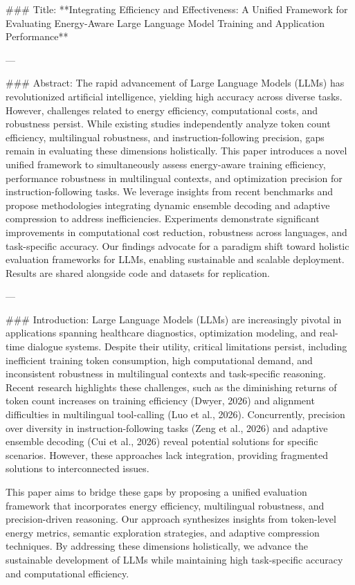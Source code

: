 ### Title:  
**Integrating Efficiency and Effectiveness: A Unified Framework for Evaluating Energy-Aware Large Language Model Training and Application Performance**

---

### Abstract:  
The rapid advancement of Large Language Models (LLMs) has revolutionized artificial intelligence, yielding high accuracy across diverse tasks. However, challenges related to energy efficiency, computational costs, and robustness persist. While existing studies independently analyze token count efficiency, multilingual robustness, and instruction-following precision, gaps remain in evaluating these dimensions holistically. This paper introduces a novel unified framework to simultaneously assess energy-aware training efficiency, performance robustness in multilingual contexts, and optimization precision for instruction-following tasks. We leverage insights from recent benchmarks and propose methodologies integrating dynamic ensemble decoding and adaptive compression to address inefficiencies. Experiments demonstrate significant improvements in computational cost reduction, robustness across languages, and task-specific accuracy. Our findings advocate for a paradigm shift toward holistic evaluation frameworks for LLMs, enabling sustainable and scalable deployment. Results are shared alongside code and datasets for replication.

---

### Introduction:  
Large Language Models (LLMs) are increasingly pivotal in applications spanning healthcare diagnostics, optimization modeling, and real-time dialogue systems. Despite their utility, critical limitations persist, including inefficient training token consumption, high computational demand, and inconsistent robustness in multilingual contexts and task-specific reasoning. Recent research highlights these challenges, such as the diminishing returns of token count increases on training efficiency (Dwyer, 2026) and alignment difficulties in multilingual tool-calling (Luo et al., 2026). Concurrently, precision over diversity in instruction-following tasks (Zeng et al., 2026) and adaptive ensemble decoding (Cui et al., 2026) reveal potential solutions for specific scenarios. However, these approaches lack integration, providing fragmented solutions to interconnected issues.

This paper aims to bridge these gaps by proposing a unified evaluation framework that incorporates energy efficiency, multilingual robustness, and precision-driven reasoning. Our approach synthesizes insights from token-level energy metrics, semantic exploration strategies, and adaptive compression techniques. By addressing these dimensions holistically, we advance the sustainable development of LLMs while maintaining high task-specific accuracy and computational efficiency.

